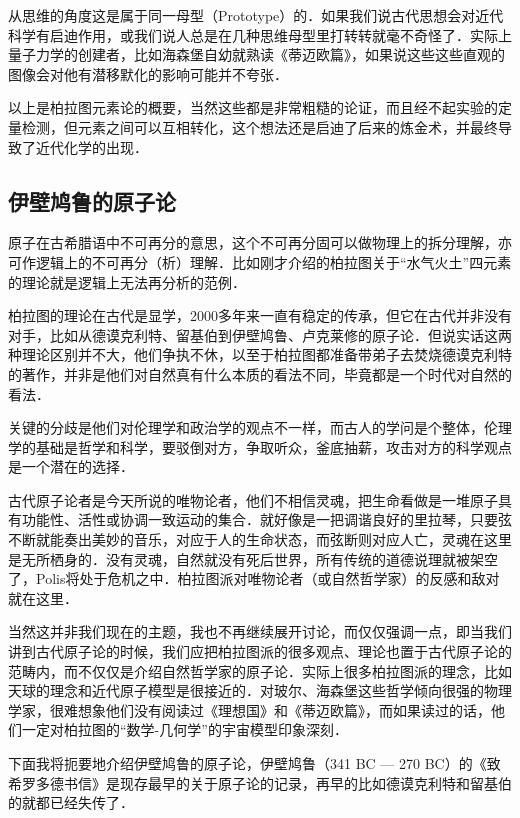 从思维的角度这是属于同一母型（Prototype）的．如果我们说古代思想会对近代科学有启迪作用，或我们说人总是在几种思维母型里打转转就毫不奇怪了．实际上量子力学的创建者，比如海森堡自幼就熟读《蒂迈欧篇》，如果说这些这些直观的图像会对他有潜移默化的影响可能并不夸张．

以上是柏拉图元素论的概要，当然这些都是非常粗糙的论证，而且经不起实验的定量检测，但元素之间可以互相转化，这个想法还是启迪了后来的炼金术，并最终导致了近代化学的出现．

\subsection{伊壁鸠鲁的原子论}

原子在古希腊语中不可再分的意思，这个不可再分固可以做物理上的拆分理解，亦可作逻辑上的不可再分（析）理解．比如刚才介绍的柏拉图关于“水气火土”四元素的理论就是逻辑上无法再分析的范例．

柏拉图的理论在古代是显学，2000多年来一直有稳定的传承，但它在古代并非没有对手，比如从德谟克利特、留基伯到伊壁鸠鲁、卢克莱修的原子论．但说实话这两种理论区别并不大，他们争执不休，以至于柏拉图都准备带弟子去焚烧德谟克利特的著作，并非是他们对自然真有什么本质的看法不同，毕竟都是一个时代对自然的看法．

关键的分歧是他们对伦理学和政治学的观点不一样，而古人的学问是个整体，伦理学的基础是哲学和科学，要驳倒对方，争取听众，釜底抽薪，攻击对方的科学观点是一个潜在的选择．

古代原子论者是今天所说的唯物论者，他们不相信灵魂，把生命看做是一堆原子具有功能性、活性或协调一致运动的集合．就好像是一把调谐良好的里拉琴，只要弦不断就能奏出美妙的音乐，对应于人的生命状态，而弦断则对应人亡，灵魂在这里是无所栖身的．没有灵魂，自然就没有死后世界，所有传统的道德说理就被架空了，Polis将处于危机之中．柏拉图派对唯物论者（或自然哲学家）的反感和敌对就在这里．

当然这并非我们现在的主题，我也不再继续展开讨论，而仅仅强调一点，即当我们讲到古代原子论的时候，我们应把柏拉图派的很多观点、理论也置于古代原子论的范畴内，而不仅仅是介绍自然哲学家的原子论．实际上很多柏拉图派的理念，比如天球的理念和近代原子模型是很接近的．对玻尔、海森堡这些哲学倾向很强的物理学家，很难想象他们没有阅读过《理想国》和《蒂迈欧篇》，而如果读过的话，他们一定对柏拉图的“数学-几何学”的宇宙模型印象深刻．

下面我将扼要地介绍伊壁鸠鲁的原子论，伊壁鸠鲁（341 BC — 270 BC）的《致希罗多德书信》是现存最早的关于原子论的记录，再早的比如德谟克利特和留基伯的就都已经失传了．

